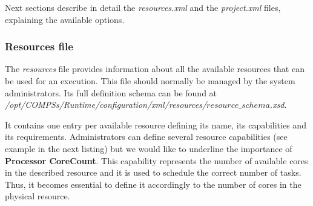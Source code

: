 Next sections describe in detail the \textit{resources.xml} and the \textit{project.xml} files, 
explaining the available options.

\subsubsection{Resources file}
The \textit{resources} file provides information about all the available resources that can be used for an execution. This file should normally be 
managed by the system administrators. Its full definition schema can be found at \\
\emph{/opt/COMPSs/Runtime/configuration/xml/resources/$resource\_schema$.xsd}.

It contains one entry per available resource defining its name, its capabilities and its requirements.
Administrators can define several resource capabilities (see example in the next listing) but we would like 
to underline the importance of \textbf{Processor CoreCount}. This capability represents the number of available cores 
in the described resource and it is used to schedule the correct number of tasks. Thus, it becomes essential to define 
it accordingly to the number of cores in the physical resource. 


